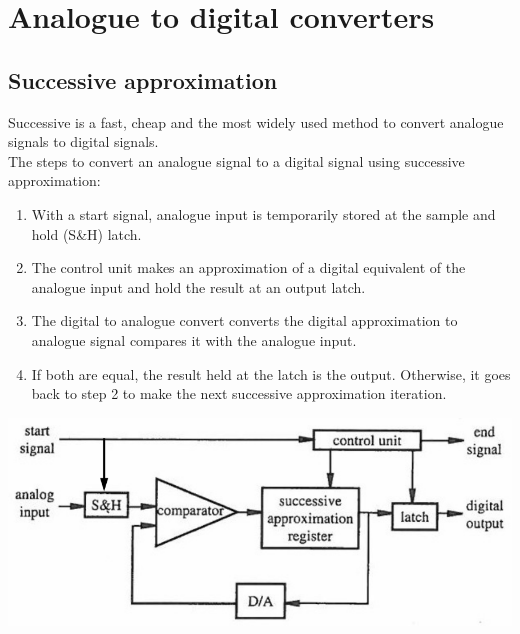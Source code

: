 \documentclass[11pt]{article}
\begin{document}
\section{Analogue to digital converters}
\label{sec:orgec8740b}

\subsection{Successive approximation}
\label{sec:orga1cf8e0}
Successive is a fast, cheap and the most widely used method to convert analogue signals to digital signals.
\\[0pt]

The steps to convert an analogue signal to a digital signal using successive approximation:
\begin{enumerate}
\item With a start signal, analogue input is temporarily stored at the sample and hold (S\&H) latch.
\item The control unit makes an approximation of a digital equivalent of the analogue input and hold the result at an output latch.
\item The digital to analogue convert converts the digital approximation to analogue signal compares it with the analogue input.
\item If both are equal, the result held at the latch is the output. Otherwise, it goes back to step 2 to make the next successive approximation iteration.
\end{enumerate}

\begin{center}
\includegraphics[width=.9\linewidth]{./images/successive-approximation.png}
\end{center}
\end{document}
